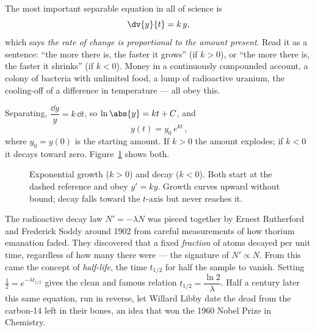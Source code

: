 The most important separable equation in all of science is
\[
  \dv{y}{t} = k\,y,
\]
which says \emph{the rate of change is proportional to the amount present}. Read it
as a sentence: ``the more there is, the faster it grows'' (if $k>0$), or ``the more
there is, the faster it shrinks'' (if $k<0$). Money in a continuously compounded
account, a colony of bacteria with unlimited food, a lump of radioactive uranium,
the cooling-off of a difference in temperature --- all obey this.

Separating, $\dfrac{\dd y}{y} = k\,\dd t$, so $\ln\abs{y} = kt + C$, and
\[
  \boxed{\,y(t) = y_0\,e^{kt}\,},
\]
where $y_0=y(0)$ is the starting amount. If $k>0$ the amount explodes; if $k<0$ it
decays toward zero. Figure~\ref{ch37:growth-decay} shows both.

\begin{figure}[H]
\centering
{}
\caption{Exponential growth ($k>0$) and decay ($k<0$). Both start at the dashed
reference and obey $y'=ky$. Growth curves upward without bound; decay falls toward
the $t$-axis but never reaches it.}
\label{ch37:growth-decay}
\end{figure}

\begin{historybox}
The radioactive decay law $N'=-\lambda N$ was pieced together by Ernest Rutherford
and Frederick Soddy around 1902 from careful measurements of how thorium emanation
faded. They discovered that a fixed \emph{fraction} of atoms decayed per unit time,
regardless of how many there were --- the signature of $N'\propto N$. From this came
the concept of \emph{half-life}, the time $t_{1/2}$ for half the sample to vanish.
Setting $\tfrac12 = e^{-\lambda t_{1/2}}$ gives the clean and famous relation
$t_{1/2} = \dfrac{\ln 2}{\lambda}$. Half a century later this same equation, run in
reverse, let Willard Libby date the dead from the carbon-14 left in their bones, an
idea that won the 1960 Nobel Prize in Chemistry.
\end{historybox}


